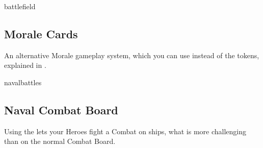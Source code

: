 \begin{multicols*}{2}
\begin{expansion}{battlefield}
	\subsection*{Morale Cards}
	An alternative Morale gameplay system, which you can use instead of the tokens, explained in .
\end{expansion}

\columnbreak
\begin{expansion}{navalbattles}
	\subsection*{Naval Combat Board}
	Using the  lets your Heroes fight a Combat on ships, what is more challenging than on the normal Combat Board.
\end{expansion}
\end{multicols*}


